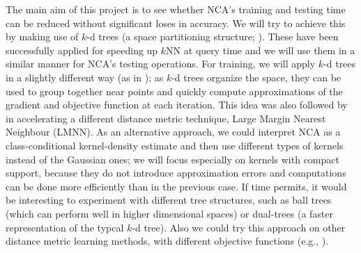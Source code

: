 The main aim of this project is to see whether NCA's training and testing time can be reduced without significant loses in accuracy. We will try to achieve this by making use of $k$-d trees (a space partitioning structure; \citealt{bentley1975}). These have been successfully applied for speeding up $k$NN at query time \citep{friedman1977} and we will use them in a similar manner for NCA's testing operations. For training, we will apply $k$-d trees in a slightly different way (as in \citealp{deng1995}); as $k$-d trees organize the space, they can be used to group together near points and quickly compute approximations of the gradient and objective function at each iteration. This idea was also followed by \citet{weinberger2009} in accelerating a different distance metric technique, Large Margin Nearest Neighbour (LMNN). As an alternative approach, we could interpret NCA as a class-conditional kernel-density estimate and then use different types of kernels instead of the Gaussian ones; we will focus especially on kernels with compact support, because they do not introduce approximation errors and computations can be done more efficiently than in the previous case. If time permits, it would be interesting to experiment with different tree structures, such as ball trees \citep{omohundro1989, moore2000} (which can perform well in higher dimensional spaces) or dual-trees \citep{gray2003} (a faster representation of the typcal $k$-d tree). Also we could try this approach on other distance metric learning methods, with different objective functions (e.g., \citealp{xing2003}).